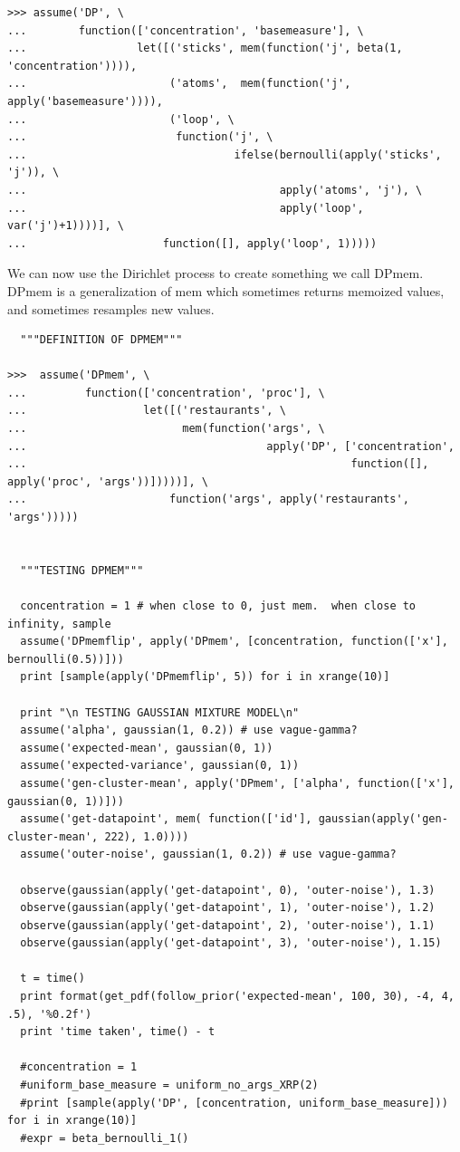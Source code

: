 \documentclass[11pt]{article}
\begin{document}
\begin{small}
\begin{verbatim}
>>> assume('DP', \
...        function(['concentration', 'basemeasure'], \
...                 let([('sticks', mem(function('j', beta(1, 'concentration')))),
...                      ('atoms',  mem(function('j', apply('basemeasure')))),
...                      ('loop', \
...                       function('j', \
...                                ifelse(bernoulli(apply('sticks', 'j')), \
...                                       apply('atoms', 'j'), \
...                                       apply('loop', var('j')+1))))], \
...                     function([], apply('loop', 1)))))  
\end{verbatim}
\end{small}

We can now use the Dirichlet process to create something we call DPmem.  DPmem is a generalization of mem which sometimes returns memoized values, and sometimes resamples new values.  

\begin{small}
\begin{verbatim}
  """DEFINITION OF DPMEM"""

>>>  assume('DPmem', \
...         function(['concentration', 'proc'], \
...                  let([('restaurants', \
...                        mem(function('args', \
...                                     apply('DP', ['concentration', 
...                                                  function([], apply('proc', 'args'))]))))], \
...                      function('args', apply('restaurants', 'args'))))) 


  """TESTING DPMEM"""

  concentration = 1 # when close to 0, just mem.  when close to infinity, sample 
  assume('DPmemflip', apply('DPmem', [concentration, function(['x'], bernoulli(0.5))]))
  print [sample(apply('DPmemflip', 5)) for i in xrange(10)]

  print "\n TESTING GAUSSIAN MIXTURE MODEL\n"
  assume('alpha', gaussian(1, 0.2)) # use vague-gamma? 
  assume('expected-mean', gaussian(0, 1)) 
  assume('expected-variance', gaussian(0, 1)) 
  assume('gen-cluster-mean', apply('DPmem', ['alpha', function(['x'], gaussian(0, 1))]))
  assume('get-datapoint', mem( function(['id'], gaussian(apply('gen-cluster-mean', 222), 1.0))))
  assume('outer-noise', gaussian(1, 0.2)) # use vague-gamma?

  observe(gaussian(apply('get-datapoint', 0), 'outer-noise'), 1.3)
  observe(gaussian(apply('get-datapoint', 1), 'outer-noise'), 1.2)
  observe(gaussian(apply('get-datapoint', 2), 'outer-noise'), 1.1)
  observe(gaussian(apply('get-datapoint', 3), 'outer-noise'), 1.15)

  t = time()
  print format(get_pdf(follow_prior('expected-mean', 100, 30), -4, 4, .5), '%0.2f')
  print 'time taken', time() - t

  #concentration = 1
  #uniform_base_measure = uniform_no_args_XRP(2)
  #print [sample(apply('DP', [concentration, uniform_base_measure])) for i in xrange(10)]
  #expr = beta_bernoulli_1()

\end{verbatim}
\end{small}
\end{document}
